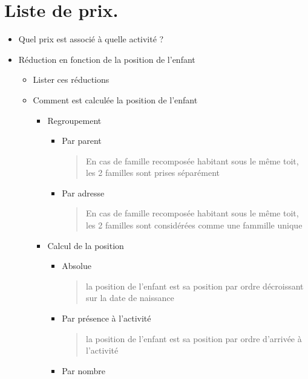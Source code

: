 \documentclass[letterpaper,10pt,english]{sphinxmanual}
\begin{document}
\section{Liste de prix.}
\label{checklist:liste-de-prix}\begin{itemize}
\item {} 
Quel prix est associé à quelle activité ?

\item {} 
Réduction en fonction de la position de l'enfant
\begin{itemize}
\item {} 
Lister ces réductions

\item {} 
Comment est calculée la position de l'enfant
\begin{itemize}
\item {} 
Regroupement
\begin{itemize}
\item {} 
Par parent
\begin{quote}

En cas de famille recomposée habitant sous le même toit, les 2 familles sont prises séparément
\end{quote}

\item {} 
Par adresse
\begin{quote}

En cas de famille recomposée habitant sous le même toit, les 2 familles sont considérées comme une fammille unique
\end{quote}

\end{itemize}

\item {} 
Calcul de la position
\begin{itemize}
\item {} 
Absolue
\begin{quote}

la position de l'enfant est sa position par ordre décroissant sur la date de naissance
\end{quote}

\item {} 
Par présence à l'activité
\begin{quote}

la position de l'enfant est sa position par ordre d'arrivée à l'activité
\end{quote}

\item {} 
Par nombre
\begin{quote}


\end{quote}
\end{itemize}
\end{itemize}
\end{itemize}
\end{itemize}
\end{document}
